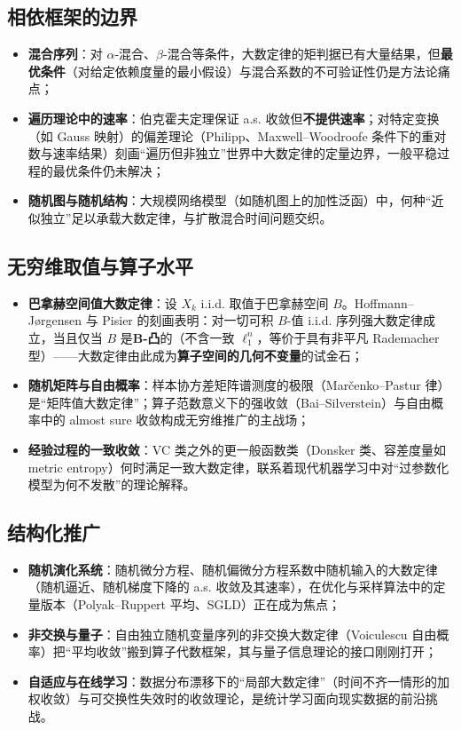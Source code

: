 \subsection{相依框架的边界}

\begin{itemize}
    \item \textbf{混合序列}：对 $\alpha$-混合、$\beta$-混合等条件，大数定律的矩判据已有大量结果，但\textbf{最优条件}（对给定依赖度量的最小假设）与混合系数的不可验证性仍是方法论痛点；
    \item \textbf{遍历理论中的速率}：伯克霍夫定理保证 a.s. 收敛但\textbf{不提供速率}；对特定变换（如 Gauss 映射）的偏差理论（Philipp、Maxwell--Woodroofe 条件下的重对数与速率结果）刻画“遍历但非独立”世界中大数定律的定量边界，一般平稳过程的最优条件仍未解决；
    \item \textbf{随机图与随机结构}：大规模网络模型（如随机图上的加性泛函）中，何种“近似独立”足以承载大数定律，与扩散混合时间问题交织。
\end{itemize}

\subsection{无穷维取值与算子水平}

\begin{itemize}
    \item \textbf{巴拿赫空间值大数定律}：设 $X_k$ i.i.d. 取值于巴拿赫空间 $B$。Hoffmann--J\o rgensen 与 Pisier 的刻画表明：对一切可积 $B$-值 i.i.d. 序列强大数定律成立，当且仅当 $B$ 是\textbf{B-凸}的（不含一致 $\ell_1^n$，等价于具有非平凡 Rademacher 型）\cite{ledouxtalagrand1991}——大数定律由此成为\textbf{算子空间的几何不变量}的试金石；
    \item \textbf{随机矩阵与自由概率}：样本协方差矩阵谱测度的极限（Mar\v{c}enko--Pastur 律）是“矩阵值大数定律”；算子范数意义下的强收敛（Bai--Silverstein）与自由概率中的 almost sure 收敛构成无穷维推广的主战场；
    \item \textbf{经验过程的一致收敛}：VC 类之外的更一般函数类（Donsker 类、容差度量如 metric entropy）何时满足一致大数定律，联系着现代机器学习中对“过参数化模型为何不发散”的理论解释。
\end{itemize}

\subsection{结构化推广}

\begin{itemize}
    \item \textbf{随机演化系统}：随机微分方程、随机偏微分方程系数中随机输入的大数定律（随机逼近、随机梯度下降的 a.s. 收敛及其速率），在优化与采样算法中的定量版本（Polyak--Ruppert 平均、SGLD）正在成为焦点；
    \item \textbf{非交换与量子}：自由独立随机变量序列的非交换大数定律（Voiculescu 自由概率）把“平均收敛”搬到算子代数框架，其与量子信息理论的接口刚刚打开；
    \item \textbf{自适应与在线学习}：数据分布漂移下的“局部大数定律”（时间不齐一情形的加权收敛）与可交换性失效时的收敛理论，是统计学习面向现实数据的前沿挑战。
\end{itemize}

